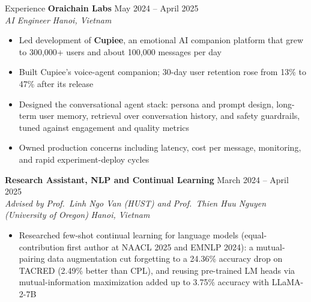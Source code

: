 \documentclass{resume} %
\begin{document}
\begin{rSection}{Experience}
\textbf{Oraichain Labs} \hfill May 2024 -- April 2025\\
\textit{AI Engineer} \hfill \textit{Hanoi, Vietnam}

\begin{itemize}[leftmargin=1.5em,itemsep=0em,topsep=0.1em]
    \item Led development of \textbf{Cupiee}, an emotional AI companion platform
    that grew to 300,000+ users and about 100,000 messages per day
    \item Built Cupiee's voice-agent companion; 30-day user retention rose from
    13\% to 47\% after its release
    \item Designed the conversational agent stack: persona and prompt design,
    long-term user memory, retrieval over conversation history, and safety
    guardrails, tuned against engagement and quality metrics
    \item Owned production concerns including latency, cost per message,
    monitoring, and rapid experiment-deploy cycles
\end{itemize}

\vspace{0.3em}

\textbf{Research Assistant, NLP and Continual Learning}
\hfill March 2024 -- April 2025\\
\textit{Advised by Prof.\ Linh Ngo Van (HUST) and Prof.\ Thien Huu Nguyen
(University of Oregon)} \hfill \textit{Hanoi, Vietnam}

\begin{itemize}[leftmargin=1.5em,itemsep=0em,topsep=0.1em]
    \item Researched few-shot continual learning for language models
    (equal-contribution first author at NAACL 2025 and EMNLP 2024): a
    mutual-pairing data augmentation cut forgetting to a 24.36\% accuracy drop
    on TACRED (2.49\% better than CPL), and reusing pre-trained LM heads via
    mutual-information maximization added up to 3.75\% accuracy with LLaMA-2-7B
\end{itemize}

\end{rSection}

\end{document}
